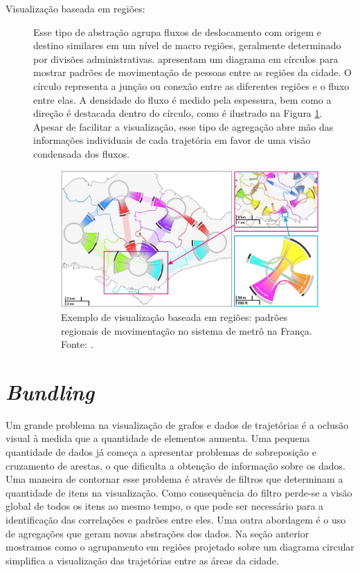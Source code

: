 \begin{description}
  \item[Visualização baseada em regiões:] Esse tipo de abstração agrupa fluxos
de deslocamento com origem e destino similares em um nível de macro regiões,
geralmente determinado por divisões administrativas.  \citet{Zeng2013}
apresentam um diagrama em círculos para mostrar padrões de movimentação de
pessoas entre as regiões da cidade. O círculo representa a junção ou conexão
entre as diferentes regiões e o fluxo entre elas. A densidade do fluxo é medido
pela espessura, bem como a direção é destacada dentro do círculo, como é
ilustrado na Figura \ref{fig:interchange-circo}. Apesar de facilitar a
visualização, esse tipo de agregação abre mão das informações individuais de
cada trajetória em favor de uma visão condensada dos fluxos.

\begin{figure}[!h]
  \centering
  \includegraphics[width=0.97\textwidth]{../figuras/region-based.png}
  \caption[Exemplo de visualização baseada em regiões do sistema de metrô na França]{Exemplo de visualização baseada em regiões: padrões regionais de movimentação no sistema de metrô na França. Fonte: \citet{Zeng2013}.}
  \label{fig:interchange-circo}
\end{figure}
\end{description}

\section{\emph{Bundling}}
\label{sec:bundling}

  Um grande problema na visualização de grafos e dados de trajetórias é a
oclusão visual à medida que a quantidade de elementos aumenta. Uma pequena
quantidade de dados já começa a apresentar problemas de sobreposição e
cruzamento de arestas, o que dificulta a obtenção de informação sobre os dados.
Uma maneira de contornar esse problema é através de filtros que determinam a
quantidade de itens na visualização. Como consequência do filtro perde-se a
visão global de todos os itens ao mesmo tempo, o que pode ser necessário para a
identificação das correlações e padrões entre eles. Uma outra abordagem é o uso
de agregações que geram novas abstrações dos dados. Na seção anterior mostramos
como o agrupamento em regiões projetado sobre um diagrama circular simplifica a
visualização das trajetórias entre as áreas da cidade.

